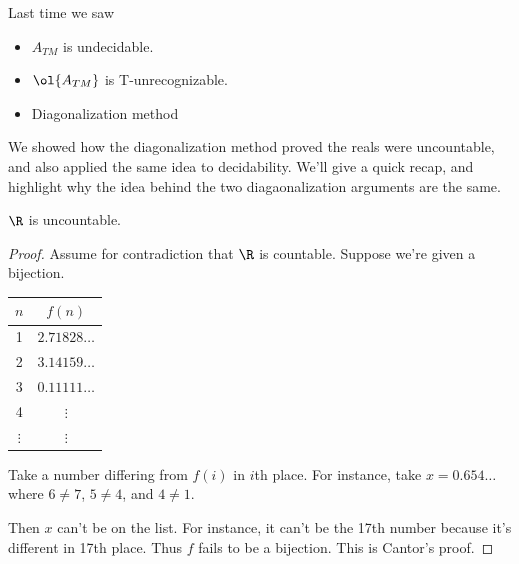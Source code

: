 
Last time we saw
\begin{itemize}
\item
$A_{TM}$ is undecidable.
\item
$\ol{A_{TM}}$ is T-unrecognizable.
\item 
Diagonalization method
\end{itemize}
We showed how the diagonalization method proved the reals were uncountable, and also applied the same idea to decidability. We'll give a quick recap, and highlight why the idea behind the two diagaonalization arguments are the same.
\begin{thm}
$\R$ is uncountable.
\end{thm}
\begin{proof}
Assume for contradiction that $\R$ is countable.
Suppose we're given a bijection.

\begin{center}
\begin{tabular}{c|c}
$n$ & $f(n)$\tabularnewline
\hline 
1 & $2.71828\ldots$\tabularnewline
2 & $3.14159\ldots$\tabularnewline
3 & $0.11111\ldots$\tabularnewline
4 & $\vdots$\tabularnewline
$\vdots$ & $\vdots$\tabularnewline
\end{tabular}
\end{center}

Take a number differing from $f(i)$ in $i$th place. For instance, take $x=0.654\ldots$ where $6\ne 7$, $5\ne 4$, and $4\ne 1$.

Then $x$ can't be on the list. For instance, it can't be the 17th number because it's different in 17th place. Thus $f$ fails to be a bijection. This is Cantor's proof.
\end{proof}

